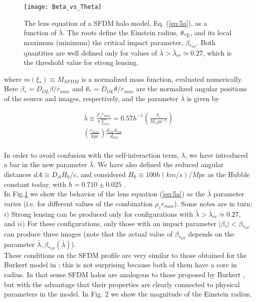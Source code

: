 \documentclass[8pt,letterpaper,twocolumn]{article}
\begin{document}
\begin{figure}[H] 
\label{fig:1}
\centering
\texttt{[image: Beta\_vs\_Theta]}
\caption{The lens equation of a SFDM halo model, Eq. (\ref{eq:5a}), as a function of $\bar{\lambda}$. The roots define the Einstein radius, $\theta_{*E}$, and its local maximum (minimum) the critical impact parameter, $\beta_{*cr}$. Both quantities are well defined only for values of $\bar{\lambda} > \bar{\lambda}_{cr} \simeq 0.27$, which is the threshold value for strong lensing.}
\end{figure}

where $m(\xi_*) \equiv M_{SFDM}$  is a normalized mass function, evaluated numerically. Here $\beta_* = D_{OL} \beta / r_{max}$ and $\theta_* = D_{OL} \theta/r_{max}$ are the normalized angular positions of the source and images, respectively, and the parameter $\bar{\lambda}$ is given by

\begin{multline}\tag{5b} \label{eq:5b}
\bar{\lambda} \equiv \frac{\rho_cr_{max}}{\pi {\textstyle \sum}_{cr}}=0.57h^{-1} \left(\frac{\rho_c}{M_\odot pc^{-3}} \right)\\
\left(\frac{r_{max}}{kpc}\right)\frac{d_{OL}d_{LS}}{d_{OS}}
\end{multline}
\\
In order to avoid confusion with the self-interaction term, $\lambda$, we have introduced a bar in the new parameter $\bar{\lambda}$. We have also defined the reduced angular distances $dA \equiv D_AH_0/c$, and considered $H_0 \equiv 100h(km/s)/Mpc$ as the Hubble constant today, with $h = 0.710 \pm 0.025$ \cite{Jarosik_2011}.\\

In Fig.\ref{fig:1}  we show the behavior of the lens equation (\ref{eq:5a}) as the $\bar{\lambda}$ parameter varies (i.e. for different values of the combination $\rho_c r_{max}$). Some notes are in turn: $i)$ Strong lensing can be produced only for configurations with $\bar{\lambda} > \bar{\lambda}_{cr} \simeq 0.27$, and $ii)$ For these configurations, only those with an impact parameter $|\beta_*|<\beta_{*cr} $ can produce three images (note that the actual value of $\beta_{*cr}$ depends on the parameter $\bar{\lambda}, \beta_{*cr}(\bar{\lambda})$).\\

These conditions on the SFDM profile are very similar to those obtained for the Burkert model in \cite{Park_2003}; this is not surprising because both of them have a core in radius. In that sense SFDM halos are analogous to those proposed by Burkert \cite{Burkert_1995}, but with the advantage that their properties are clearly connected to physical parameters in the model.
In Fig. 2 we show the magnitude of the Einstein radius, 
\end{document}
